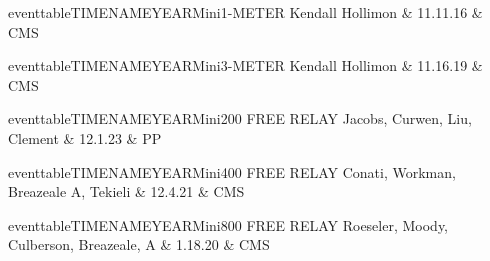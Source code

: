 \begin{minipage}[t]{0.44\textwidth}
\centering
eventtableTIMENAMEYEARMini{1-METER}{
Kendall Hollimon & 11.11.16 & CMS \\
}
\end{minipage}\hfill
\begin{minipage}[t]{0.44\textwidth}
\centering

\end{minipage}

\vspace{0.3cm}

\begin{minipage}[t]{0.44\textwidth}
\centering
eventtableTIMENAMEYEARMini{3-METER}{
Kendall Hollimon & 11.16.19 & CMS \\
}
\end{minipage}\hfill
\begin{minipage}[t]{0.44\textwidth}
\centering

\end{minipage}

\vspace{0.3cm}

\begin{minipage}[t]{0.44\textwidth}
\centering
eventtableTIMENAMEYEARMini{200 FREE RELAY}{
Jacobs, Curwen, Liu, Clement & 12.1.23 & PP \\
}
\end{minipage}\hfill
\begin{minipage}[t]{0.44\textwidth}
\centering

\end{minipage}

\vspace{0.3cm}

\begin{minipage}[t]{0.44\textwidth}
\centering
eventtableTIMENAMEYEARMini{400 FREE RELAY}{
Conati, Workman, Breazeale A, Tekieli & 12.4.21 & CMS \\
}
\end{minipage}\hfill
\begin{minipage}[t]{0.44\textwidth}
\centering

\end{minipage}

\vspace{0.3cm}

\begin{minipage}[t]{0.44\textwidth}
\centering
eventtableTIMENAMEYEARMini{800 FREE RELAY}{
Roeseler, Moody, Culberson, Breazeale, A & 1.18.20 & CMS \\
}
\end{minipage}\hfill
\begin{minipage}[t]{0.44\textwidth}
\centering

\end{minipage}

